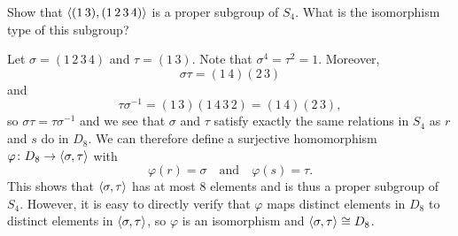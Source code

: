  Show that $\langle{(1\,3), (1\,2\,3\,4)}\rangle$ is a proper subgroup
of $S_4$. What is the isomorphism type of this subgroup?
\begin{solution}
  Let $\sigma = (1\,2\,3\,4)$ and $\tau = (1\,3)$. Note that
  $\sigma^4 = \tau^2 = 1$. Moreover,
  \begin{equation*}
    \sigma\tau = (1\,4)(2\,3)
  \end{equation*}
  and
  \begin{equation*}
    \tau\sigma^{-1} = (1\,3)(1\,4\,3\,2) = (1\,4)(2\,3),
  \end{equation*}
  so $\sigma\tau = \tau\sigma^{-1}$ and we see that $\sigma$ and
  $\tau$ satisfy exactly the same relations in $S_4$ as $r$ and $s$ do
  in $D_8$. We can therefore define a surjective homomorphism
  $\varphi\colon D_8\to\langle{\sigma,\tau}\rangle$ with
  \begin{equation*}
    \varphi(r) = \sigma
    \quad\text{and}\quad
    \varphi(s) = \tau.
  \end{equation*}
  This shows that $\langle{\sigma,\tau}\rangle$ has at most $8$ elements and is
  thus a proper subgroup of $S_4$. However, it is easy to directly
  verify that $\varphi$ maps distinct elements in $D_8$ to distinct
  elements in $\langle{\sigma,\tau}\rangle$, so $\varphi$ is an isomorphism and
  $\langle{\sigma,\tau}\rangle\cong D_8$.
\end{solution}
